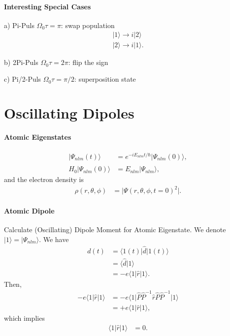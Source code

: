 \documentclass[../../note.tex]{subfiles}
\begin{document}
\paragraph{Interesting Special Cases}
a) Pi-Puls $\Omega_0 \tau = \pi$: swap population 
\begin{align}
    \vert 1 \rangle \rightarrow i \vert 2 \rangle \\
    \vert 2 \rangle \rightarrow i \vert 1 \rangle.
\end{align}

b) 2Pi-Puls $\Omega_0 \tau = 2 \pi$: flip the sign

c) Pi/2-Puls $\Omega_0 \tau = \pi/2$: superposition state

\section{Oscillating Dipoles}
\paragraph{Atomic Eigenstates}
\begin{align}
    \vert \Psi_{nlm}(t) \rangle 
    &= e^{-i E_{nlm} t/\hbar} \vert \Psi_{nlm}(0) \rangle, \\
    \hat{H_0} \vert \Psi_{nlm}(0) \rangle
    &= E_{nlm} \vert \Psi_{nlm} \rangle,
\end{align}
and the electron density is
\begin{align}
    \rho(r, \theta, \phi)
    &= \vert \Psi(r, \theta, \phi, t = 0)^2 \vert.
\end{align}

\paragraph{Atomic Dipole}
Calculate (Oscillating) Dipole Moment for Atomic Eigenstate. We denote 
$\vert 1 \rangle = \vert \Psi_{nlm} \rangle$. We have
\begin{align}
    d(t)
    &= \langle 1(t) \vert \hat{d} \vert 1(t) \rangle \\
    &= \langle \hat{d} \vert 1 \rangle \\
    &= -e \langle 1 \vert \hat{r} \vert 1 \rangle.
\end{align}
Then, 
\begin{align}
    -e \langle 1 \vert \hat{r} \vert 1 \rangle 
    &= -e \langle 1 \vert \hat{P} \hat{P}^{-1} \hat{r} \hat{P} \hat{P}^{-1} \vert 1 \rangle \\
    &= + e \langle 1 \vert \hat{r} \vert 1 \rangle,
\end{align}
which implies
\begin{align}
    \langle 1 \vert \hat{r} \vert 1 \rangle 
    &= 0.
\end{align}
\end{document}

